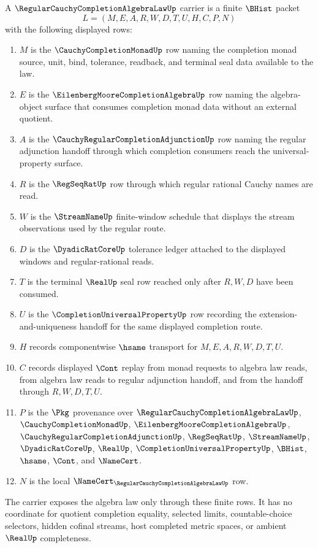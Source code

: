 \begin{definition}
\label{def:regular-cauchy-completion-algebra-law-carrier}
A $\RegularCauchyCompletionAlgebraLawUp$ carrier is a finite $\BHist$ packet
$$
L=(M,E,A,R,W,D,T,U,H,C,P,N)
$$
with the following displayed rows:
\begin{enumerate}
\item $M$ is the $\CauchyCompletionMonadUp$ row naming the completion monad source, unit, bind, tolerance, readback, and terminal seal data available to the law.
\item $E$ is the $\EilenbergMooreCompletionAlgebraUp$ row naming the algebra-object surface that consumes completion monad data without an external quotient.
\item $A$ is the $\CauchyRegularCompletionAdjunctionUp$ row naming the regular adjunction handoff through which completion consumers reach the universal-property surface.
\item $R$ is the $\RegSeqRatUp$ row through which regular rational Cauchy names are read.
\item $W$ is the $\StreamNameUp$ finite-window schedule that displays the stream observations used by the regular route.
\item $D$ is the $\DyadicRatCoreUp$ tolerance ledger attached to the displayed windows and regular-rational reads.
\item $T$ is the terminal $\RealUp$ seal row reached only after $R,W,D$ have been consumed.
\item $U$ is the $\CompletionUniversalPropertyUp$ row recording the extension-and-uniqueness handoff for the same displayed completion route.
\item $H$ records componentwise $\hsame$ transport for $M,E,A,R,W,D,T,U$.
\item $C$ records displayed $\Cont$ replay from monad requests to algebra law reads, from algebra law reads to regular adjunction handoff, and from the handoff through $R,W,D,T,U$.
\item $P$ is the $\Pkg$ provenance over $\RegularCauchyCompletionAlgebraLawUp$, $\CauchyCompletionMonadUp$, $\EilenbergMooreCompletionAlgebraUp$, $\CauchyRegularCompletionAdjunctionUp$, $\RegSeqRatUp$, $\StreamNameUp$, $\DyadicRatCoreUp$, $\RealUp$, $\CompletionUniversalPropertyUp$, $\BHist$, $\hsame$, $\Cont$, and $\NameCert$.
\item $N$ is the local $\NameCert_{\RegularCauchyCompletionAlgebraLawUp}$ row.
\end{enumerate}
The carrier exposes the algebra law only through these finite rows. It has no coordinate for quotient completion equality, selected limits, countable-choice selectors, hidden cofinal streams, host completed metric spaces, or ambient $\RealUp$ completeness.
\end{definition}

